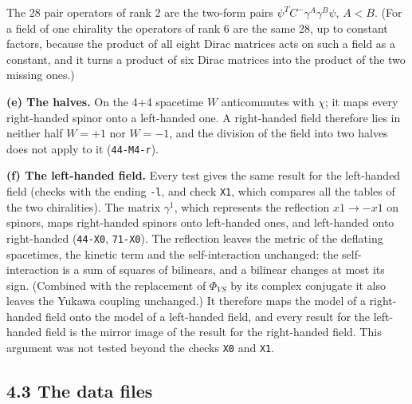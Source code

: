 \documentclass[
  10pt,
]{article}
\begin{document}
The 28 pair operators of rank 2 are the two-form pairs
\(\psi^TC^-\gamma^A\gamma^B\psi\), \(A<B\). (For a field of one
chirality the operators of rank 6 are the same 28, up to constant
factors, because the product of all eight Dirac matrices acts on such a
field as a constant, and it turns a product of six Dirac matrices into
the product of the two missing ones.)

\textbf{(e) The halves.} On the 4+4 spacetime \(W\) anticommutes with
\(\chi\); it maps every right-handed spinor onto a left-handed one. A
right-handed field therefore lies in neither half \(W=+1\) nor \(W=-1\),
and the division of the field into two halves does not apply to it
(\texttt{44-M4-r}).

\textbf{(f) The left-handed field.} Every test gives the same result for
the left-handed field (checks with the ending \texttt{-l}, and check
\texttt{X1}, which compares all the tables of the two chiralities). The
matrix \(\gamma^{1}\), which represents the reflection \(x1\to-x1\) on
spinors, maps right-handed spinors onto left-handed ones, and
left-handed onto right-handed (\texttt{44-X0}, \texttt{71-X0}). The
reflection leaves the metric of the deflating spacetimes, the kinetic
term and the self-interaction unchanged: the self-interaction is a sum
of squares of bilinears, and a bilinear changes at most its sign.
(Combined with the replacement of \(\Phi_{VS}\) by its complex conjugate
it also leaves the Yukawa coupling unchanged.) It therefore maps the
model of a right-handed field onto the model of a left-handed field, and
every result for the left-handed field is the mirror image of the result
for the right-handed field. This argument was not tested beyond the
checks \texttt{X0} and \texttt{X1}.

\hypertarget{the-data-files}{%
\subsection{4.3 The data files}\label{the-data-files}}
\end{document}

